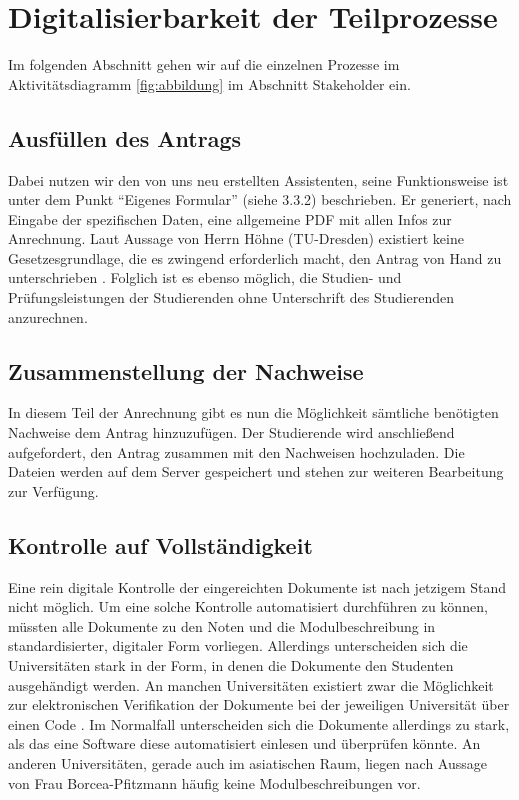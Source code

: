 \section{Digitalisierbarkeit der Teilprozesse}

Im folgenden Abschnitt gehen wir auf die einzelnen Prozesse im Aktivitätsdiagramm \cref{fig:abbildung} im Abschnitt Stakeholder ein.

\subsection{Ausfüllen des Antrags}
Dabei nutzen wir den von uns neu erstellten Assistenten, seine Funktionsweise ist unter dem Punkt “Eigenes Formular” (siehe 3.3.2) beschrieben. Er generiert, nach Eingabe der spezifischen Daten, eine allgemeine PDF mit allen Infos zur Anrechnung. Laut Aussage von Herrn Höhne (TU-Dresden) existiert keine Gesetzesgrundlage, die es zwingend erforderlich macht, den Antrag von Hand zu unterschrieben \parencite{email}. Folglich ist es ebenso möglich, die Studien- und Prüfungsleistungen der Studierenden ohne Unterschrift des Studierenden anzurechnen.

\subsection{Zusammenstellung der Nachweise}
In diesem Teil der Anrechnung gibt es nun die Möglichkeit sämtliche benötigten Nachweise dem Antrag hinzuzufügen. Der Studierende wird anschließend aufgefordert, den Antrag zusammen mit den Nachweisen hochzuladen. Die Dateien werden auf dem Server gespeichert und stehen zur weiteren Bearbeitung zur Verfügung.

\subsection{Kontrolle auf Vollständigkeit}
Eine rein digitale Kontrolle der eingereichten Dokumente ist nach jetzigem Stand nicht möglich. Um eine solche Kontrolle automatisiert durchführen zu können, müssten alle Dokumente zu den Noten und die Modulbeschreibung in standardisierter,  digitaler Form vorliegen. Allerdings unterscheiden sich die Universitäten stark in der Form, in denen die Dokumente den Studenten ausgehändigt werden. An manchen Universitäten existiert zwar die Möglichkeit zur elektronischen Verifikation der Dokumente bei der jeweiligen Universität über einen Code \parencite{goettingen}. Im Normalfall unterscheiden sich die Dokumente allerdings zu stark, als das eine Software diese automatisiert einlesen und überprüfen könnte. An anderen Universitäten, gerade auch im asiatischen Raum, liegen nach Aussage von Frau Borcea-Pfitzmann häufig keine Modulbeschreibungen vor. 

